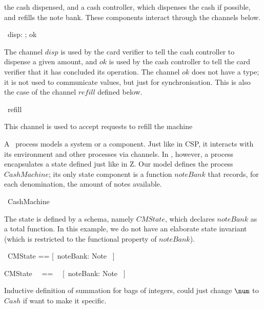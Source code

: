 \documentclass{article}
\begin{document}
the cash dispensed, and a cash controller, which dispenses the cash
if possible, and refills the note bank. These components interact
through the channels below.
\begin{circus}
  \circchannel\ disp: \nat; ok
\end{circus}
The channel $disp$ is used by the card verifier to tell the cash
controller to dispense a given amount, and $ok$ is used by the cash
controller to tell the card verifier that it has concluded its
operation. The channel $ok$ does not have a type; it is not used to
communicate values, but just for synchronisation.  This is also the
case of the channel $refill$ defined below.
\begin{circus}
  \circchannel\ refill
\end{circus}
This channel is used to accept requests to refill the machine

A \Circus\ process models a system or a component.  Just like in CSP,
it interacts with its environment and other processes via channels.
In \Circus, however, a process encapsulates a state defined just like
in Z.  Our model defines the process $CashMachine$; its only state
component is a function $noteBank$ that records, for each
denomination, the amount of notes available.
\begin{circus}
  \circprocess\ CashMachine \circdef \circbegin
\end{circus}
The state is defined by a schema, namely $CMState$, which declares
$noteBank$ as a total function.  In this example, we do not have an
elaborate state invariant (which is restricted to the functional
property of $noteBank$).
\begin{circusaction}
  \circstate\ CMState == [~noteBank: Note \fun \nat~]
\end{circusaction}
\begin{zed}
    CMState ~~==~~ [~noteBank: Note \fun \nat~]
\end{zed}

Inductive definition of summation for bags of integers,
could just change $\num$ to $Cash$ if want to make it specific.
%
\end{document}
